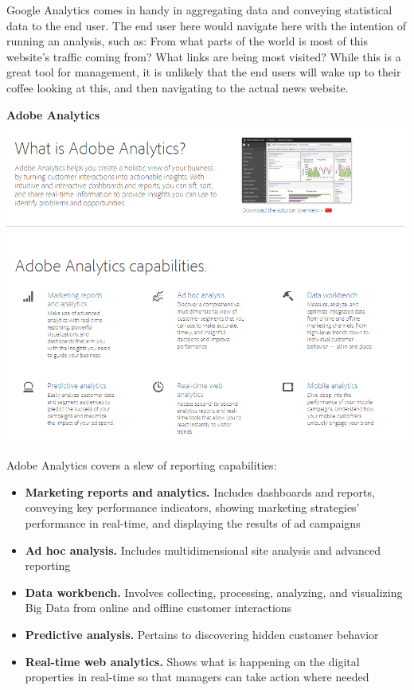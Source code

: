 \documentclass[12pt]{article}
\begin{document}
Google Analytics comes in handy in aggregating data and conveying statistical data to the end user. The end user here would navigate here with the intention of running an analysis, such as: From what parts of the world is most of this website's traffic coming from? What links are being most visited?
While this is a great tool for management, it is unlikely that the end users will wake up to their coffee looking at this, and then navigating to the actual news website. \\

\newpage

\noindent\textbf{Adobe Analytics} \\
\noindent\includegraphics[scale=0.6]{img/adobe_analytics}


Adobe Analytics covers a slew of reporting capabilities:

\begin{itemize}
\item \textbf{Marketing reports and analytics.} Includes dashboards and reports, conveying key performance indicators, showing marketing strategies' performance in real-time, and displaying the results of ad campaigns
\item \textbf{Ad hoc analysis.} Includes multidimensional site analysis and advanced reporting
\item \textbf{Data workbench.} Involves collecting, processing, analyzing, and visualizing Big Data from online and offline customer interactions
\item \textbf{Predictive analysis.} Pertains to discovering hidden customer behavior
\item \textbf{Real-time web analytics.} Shows what is happening on the digital properties in real-time so that managers can take action where needed
\end{itemize}
\end{document}
